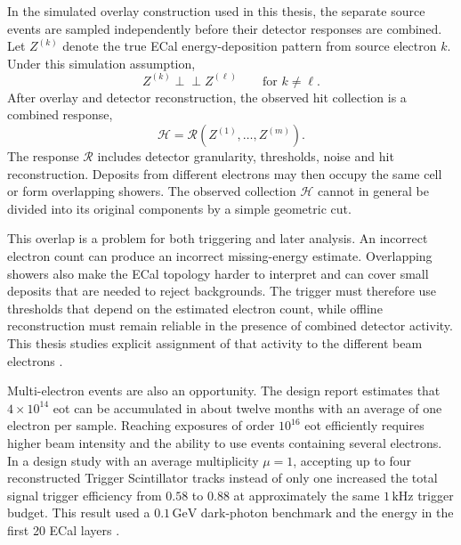 In the simulated overlay construction used in this thesis, the separate
source events are sampled independently before their detector responses are
combined. Let \(Z^{(k)}\) denote the true ECal energy-deposition pattern from
source electron \(k\). Under this simulation assumption,
\begin{equation}
    Z^{(k)} \perp\!\!\!\perp Z^{(\ell)}
    \qquad \text{for } k\neq\ell .
\end{equation}
After overlay and detector reconstruction, the observed hit collection is a
combined response,
\begin{equation}
    \mathcal{H}
    =
    \mathcal{R}\!\left(
        Z^{(1)},\ldots,Z^{(m)}
    \right).
\end{equation}
The response \(\mathcal{R}\) includes detector granularity, thresholds,
noise and hit reconstruction. Deposits from different electrons may then
occupy the same cell or form overlapping showers. The observed collection
\(\mathcal{H}\) cannot in general be divided into its original components by
a simple geometric cut.

This overlap is a problem for both triggering and later analysis. An
incorrect electron count can produce an incorrect missing-energy estimate.
Overlapping showers also make the ECal topology harder to interpret and can
cover small deposits that are needed to reject backgrounds. The trigger must
therefore use thresholds that depend on the estimated electron count, while
offline reconstruction must remain reliable in the presence of combined
detector activity. This thesis studies explicit assignment of that activity
to the different beam electrons \cite{ldmx2025-overview}.

Multi-electron events are also an opportunity. The design report estimates
that \(4\times10^{14}\) \gls{eot} can be accumulated in about twelve months
with an average of one electron per sample. Reaching exposures of order
\(10^{16}\) \gls{eot} efficiently requires higher beam intensity and the
ability to use events containing several electrons. In a design study with
an average multiplicity \(\mu=1\), accepting up to four reconstructed
Trigger Scintillator tracks instead of only one increased the total signal
trigger efficiency from \(0.58\) to \(0.88\) at approximately the same
\(1\,\mathrm{kHz}\) trigger budget. This result used a
\(0.1\,\mathrm{GeV}\) dark-photon benchmark and the energy in the first 20
ECal layers \cite{ldmx2025-overview}.


